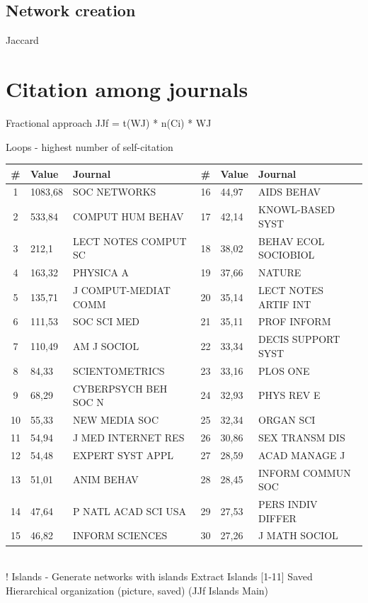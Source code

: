 \documentclass[11pt]{article} %
\begin{document}
\subsection{Network creation} 

Jaccard 


\section{Citation among journals}
Fractional approach
JJf = t(WJ) * n(Ci) * WJ

Loops - highest number of self-citation

\renewcommand{\arraystretch}{0.8}
\small
\begin{tabular}{c|l|l||c|l|l|} 
\# &	Value&	Journal &	\# &	Value&	Journal \\  \hline 
1&	1083,68&	SOC NETWORKS&	16&	44,97&	AIDS BEHAV\\
2&	533,84&	COMPUT HUM BEHAV&	17&	42,14&	KNOWL-BASED SYST\\
3&	212,1&	LECT NOTES COMPUT SC&	18&	38,02&	BEHAV ECOL SOCIOBIOL\\
4&	163,32&	PHYSICA A&	19&	37,66&	NATURE\\
5&	135,71&	J COMPUT-MEDIAT COMM&	20&	35,14&	LECT NOTES ARTIF INT\\
6&	111,53&	SOC SCI MED&	21&	35,11&	PROF INFORM\\
7&	110,49&	AM J SOCIOL&	22&	33,34&	DECIS SUPPORT SYST\\
8&	84,33&	SCIENTOMETRICS&	23&	33,16&	PLOS ONE\\
9&	68,29&	CYBERPSYCH BEH SOC N&	24&	32,93&	PHYS REV E\\
10&	55,33&	NEW MEDIA SOC&	25&	32,34&	ORGAN SCI\\
11&	54,94&	J MED INTERNET RES&	26&	30,86&	SEX TRANSM DIS\\
12&	54,48&	EXPERT SYST APPL&	27&	28,59&	ACAD MANAGE J\\
13&	51,01&	ANIM BEHAV&	28&	28,45&	INFORM COMMUN SOC\\
14&	47,64&	P NATL ACAD SCI USA&	29&	27,53&	PERS INDIV DIFFER\\
15&	46,82&	INFORM SCIENCES&	30&	27,26&	J MATH SOCIOL\\
\end{tabular}\\

! Islands - Generate networks with islands Extract Islands [1-11]
Saved
Hierarchical organization (picture, saved) (JJf Islands Main) 
\end{document}
